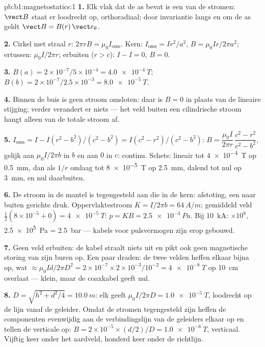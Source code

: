 \begin{solution}{pb:b1:magnetostatics:1}
\textbf{1.} Elk vlak dat de as bevat is een  van
de stromen: $\vect B$ staat er loodrecht op, orthoradiaal; door invariantie
langs en om de as geldt $\vect B = B(r)\,\vect e_\theta$.

\textbf{2.} Cirkel met straal $r$: $2\pi rB = \mu_0I_{\text{oms}}$. Kern:
$I_{\text{oms}} = Ir^2/a^2$, $B = \mu_0Ir/2\pi a^2$; ertussen: $\mu_0I/2\pi r$;
erbuiten ($r > c$): $I - I = 0$, $B = 0$.

\textbf{3.} $B(a) = 2 \times 10^{-7}/5 \times 10^{-4} = \qty{4.0e-4}{T}$; $B(b) = 2 \times
10^{-7}/2.5 \times 10^{-3} = \qty{8.0e-5}{T}$.

\textbf{4.} Binnen de buis is geen stroom omsloten: daar is $B = 0$ in plaats
van de lineaire stijging; verder verandert er niets --- het veld buiten
een cilindrische stroom hangt alleen van de totale stroom af.

\textbf{5.} $I_{\text{oms}} = I - I(r^2 - b^2)/(c^2 - b^2) = I(c^2 - r^2)/(c^2 -
b^2)$: $B = \dfrac{\mu_0I}{2\pi r}\,\dfrac{c^2 - r^2}{c^2 - b^2}$, gelijk aan $\mu_0I/2\pi b$ in
$b$ en aan $0$ in $c$: continu. Schets: lineair tot \qty{4e-4}{T} op
\qty{0.5}{mm}, dan als $1/r$ omlaag tot \qty{8e-5}{T} op \qty{2.5}{mm}, dalend tot nul op
\qty{3}{mm}, en nul daarbuiten.

\textbf{6.} De stroom in de mantel is tegengesteld aan die in de kern: afstoting,
een naar buiten gerichte druk. Oppervlaktestroom $K = I/2\pi b = \qty{64}{A/m}$; gemiddeld veld
$\tfrac12(8 \times 10^{-5} + 0) = \qty{4e-5}{T}$: $p = KB = \qty{2.5e-3}{Pa}$. Bij
\qty{10}{kA}: $\times10^8$, \qty{2.5e5}{Pa} = \qty{2.5}{bar} --- kabels voor
pulsvermogen zijn erop gebouwd.

\textbf{7.} Geen veld erbuiten: de kabel straalt niets uit en pikt ook geen
magnetische storing van zijn buren op. Een paar draden: de twee
velden heffen elkaar bijna op, wat $\approx \mu_0Id/2\pi D^2 = 2 \times 10^{-7} \times 2 \times
10^{-3}/10^{-2} = \qty{4e-8}{T}$ op \qty{10}{cm} overlaat --- klein, maar de coaxkabel geeft
nul.

\textbf{8.} $D = \sqrt{h^2 + d^2/4} = \qty{10.0}{m}$: elk geeft $\mu_0I/2\pi D =
\qty{1.0e-5}{T}$, loodrecht op de lijn vanaf de geleider. Omdat de
stromen tegengesteld zijn heffen de componenten evenwijdig aan de verbindingslijn van
de geleiders elkaar op en tellen de verticale op: $B = 2 \times 10^{-5} \times
(d/2)/D = \qty{1.0e-6}{T}$, verticaal. Vijftig keer onder het aardveld,
honderd keer onder de richtlijn.


\end{solution}
